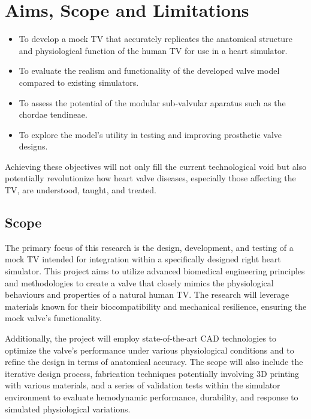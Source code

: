 \section{Aims, Scope and Limitations}
\begin{itemize}
    \item To develop a mock \gls{TV} that accurately replicates the anatomical structure and physiological function of the human \gls{TV} for use in a heart simulator.
\end{itemize}
\begin{itemize}
    \item To evaluate the realism and functionality of the developed valve model compared to existing simulators.
    \item To assess the potential of the modular sub-valvular aparatus such as the chordae tendineae.
    \item To explore the model's utility in testing and improving prosthetic valve designs.
\end{itemize}
Achieving these objectives will not only fill the current technological void but also potentially revolutionize how heart valve diseases, especially those affecting the \gls{TV}, are understood, taught, and treated.

\subsection{Scope}

The primary focus of this research is the design, development, and testing of a mock \gls{TV} intended for integration within a specifically designed right heart simulator. This project aims to utilize advanced biomedical engineering principles and methodologies to create a valve that closely mimics the physiological behaviours and properties of a natural human \gls{TV}. The research will leverage materials known for their biocompatibility and mechanical resilience, ensuring the mock valve's functionality.

Additionally, the project will employ state-of-the-art \gls{CAD} technologies to optimize the valve's performance under various physiological conditions and to refine the design in terms of anatomical accuracy. The scope will also include the iterative design process, fabrication techniques potentially involving 3D printing with various materials, and a series of validation tests within the simulator environment to evaluate hemodynamic performance, durability, and response to simulated physiological variations.


